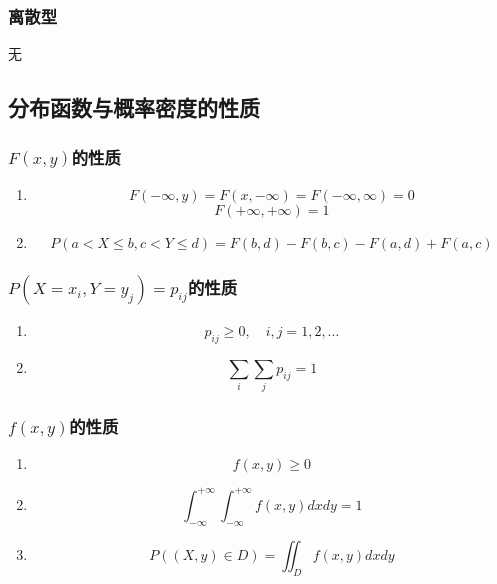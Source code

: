 \subsubsection{离散型}
无


\subsection{分布函数与概率密度的性质} %
\label{sub:性质}
\subsubsection{$F(x,y)$的性质}
\begin{enumerate}
	\item
	\begin{equation}
		F(-\infty, y) = F(x, -\infty) = F(-\infty, \infty) = 0
	\end{equation}
	\begin{equation}
		F(+\infty, +\infty) = 1
	\end{equation}

	\item 
	\begin{equation}
		P(a<X\leq b, c<Y\leq d) = F(b,d) - F(b,c) - F(a,d) + F(a,c)
	\end{equation}
\end{enumerate}

\subsubsection{$P(X=x_i, Y=y_j)=p_{ij}$的性质}
\begin{enumerate}
	\item 
	\begin{equation}
		p_{ij} \geq 0, \quad i,j = 1,2, \dots
	\end{equation}

	\item 
	\begin{equation}
		\sum_i \sum_j p_{ij} = 1
	\end{equation}
\end{enumerate}

\subsubsection{$f(x,y)$的性质}
\begin{enumerate}
	\item 
	\begin{equation}
		f(x, y) \geq 0
	\end{equation}
	\item 
	\begin{equation}
		\int_{-\infty}^{+\infty} \int_{-\infty}^{+\infty}f(x,y)dxdy = 1
	\end{equation}
	\item 
	\begin{equation}
		P((X,y)\in D) = \iint_Df(x,y) dxdy
	\end{equation}
	
\end{enumerate}



